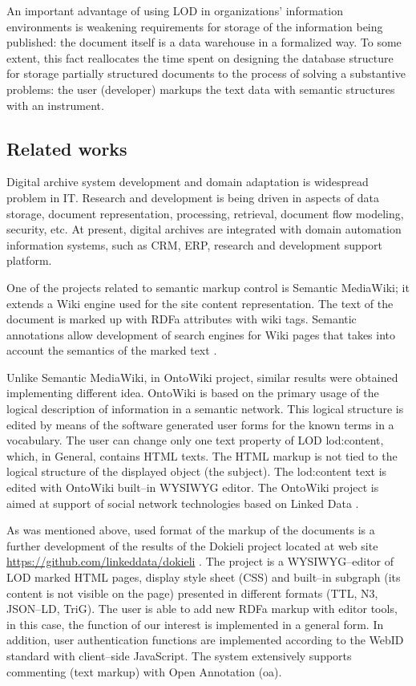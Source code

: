 \documentclass[12pt]{llncs}
\begin{document}
An important advantage of using LOD in organizations' information
environments is weakening requirements for storage of the information
being published: the document itself is a data warehouse in a formalized
way. To some extent, this fact reallocates the time spent on designing
the database structure for storage partially structured documents to the
process of solving a substantive problems: the user (developer) markups
the text data with semantic structures with an instrument.

\subsection{Related works}
\label{sec:relwks}

Digital archive system development and domain adaptation is wide\-spre\-ad
problem in IT.  Research and development is being driven in aspects of
data storage, document representation, processing, retrieval, document
flow modeling, security, etc.  At present, digital archives are integrated
with domain automation information systems, such as CRM, ERP, research and
development support platform.

One of the projects related to semantic markup control is Semantic MediaWiki; it extends a Wiki engine used for the site content representation. The text of the document is marked up with RDFa attributes with wiki tags. Semantic annotations allow development of search engines for Wiki pages that takes into account the semantics of the marked text \cite{c6}.

Unlike Semantic MediaWiki, in OntoWiki project, similar results were obtained implementing different idea. OntoWiki is based on the primary usage of the logical description of information in a semantic network. This logical structure is edited by means of the software generated user forms for the known terms in a vocabulary. The user can change only one text property of LOD lod:content, which, in General, contains HTML texts. The HTML markup is not tied to the logical structure of the displayed object (the subject). The lod:content text is edited with OntoWiki built--in WYSIWYG editor. The OntoWiki project is aimed at support of social network technologies based on Linked Data \cite{b6}.

As was mentioned above, used format of the markup of the documents is a further development of the results of the Dokieli project located at web site \url{https://github.com/linkeddata/dokieli} \cite{b14}. The project is a WYSIWYG--editor of LOD marked HTML pages, display style sheet (CSS) and built--in subgraph (its content is not visible on the page) presented in different formats (TTL, N3, JSON--LD, TriG). The user is able to add new RDFa markup with editor tools, in this case, the function of our interest is implemented in a general form. In addition, user authentication functions are implemented according to the WebID standard with client--side JavaScript. The system extensively supports commenting (text markup) with Open Annotation (oa).
\end{document}
